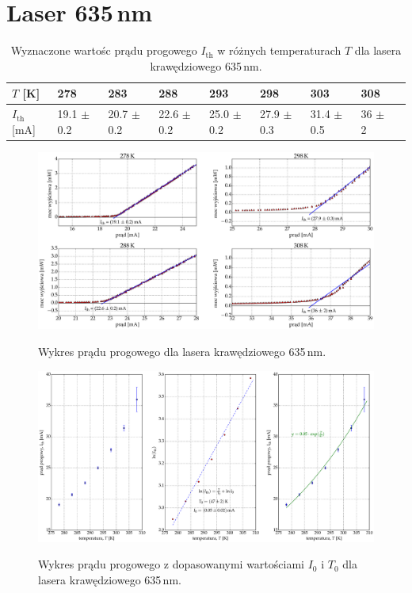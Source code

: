 \section{Laser 635\,nm}
\begin{table}
\begin{center}
\caption{ Wyznaczone wartośc prądu progowego $I_{\mathrm{th}}$ w różnych temperaturach $T$ dla lasera krawędziowego 635\,nm. }
\begin{tabular}{ | C{1.5cm}|  C{1.5cm} | C{1.5cm} | C{1.5cm}| C{1.5cm} | C{1.5cm}| C{1.5cm}| C{2.0cm}| C{2.0cm}|}
\hline
$T$ [K] 	&   278 & 283  	& 288 & 293 & 298 & 303 & 308 \\ \hline
$I_{\mathrm{th}}$ [mA]  &	19.1 $\pm$ 0.2  & 20.7 $\pm$ 0.2 & 22.6 $\pm$ 0.2 &
25.0 $\pm$ 0.2  & 27.9 $\pm$ 0.3 & 31.4 $\pm$ 0.5 & 36 $\pm$ 2	\\ \hline
\end{tabular}
\end{center}
\end{table}
\begin{figure}
\center
  \includegraphics[scale=0.30]{plot635/plot_i_th_4.eps}
  \label{rys2}
  \caption{Wykres prądu progowego dla lasera krawędziowego 635\,nm.}
\end{figure}
\begin{figure}
\center
  \includegraphics[scale=0.30]{plot635/plot_fit.eps}
  \label{rys2}
  \caption{Wykres prądu progowego z dopasowanymi wartościami $I_{0}$ i $T_{0}$ dla lasera krawędziowego 635\,nm.}
\end{figure}
